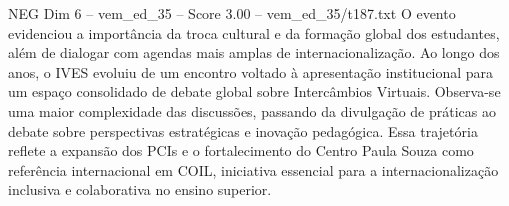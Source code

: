 \begin{textsample}{NEG Dim 6 – vem\_ed\_35 – Score 3.00 – vem\_ed\_35/t187.txt}
O evento evidenciou a importância da troca cultural e da formação global dos estudantes, além de dialogar com agendas mais amplas de internacionalização.
Ao longo dos anos, o IVES evoluiu de um encontro voltado à apresentação institucional para um espaço consolidado de debate global sobre Intercâmbios Virtuais.
Observa-se uma maior complexidade das discussões, passando da divulgação de práticas ao debate sobre perspectivas estratégicas e inovação pedagógica.
Essa trajetória reflete a expansão dos PCIs e o fortalecimento do Centro Paula Souza como referência internacional em COIL, iniciativa essencial para a internacionalização inclusiva e colaborativa no ensino superior.

\end{textsample}
